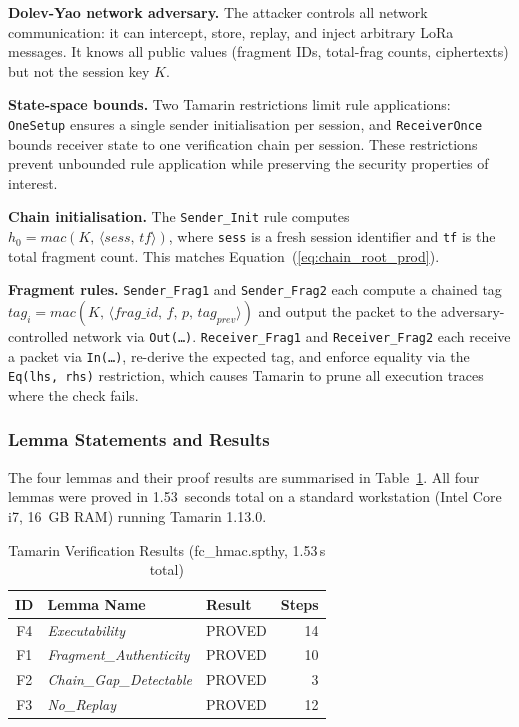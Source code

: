\documentclass[journal]{IEEEtran}
\begin{document}
\textbf{Dolev-Yao network adversary.}  The attacker controls all network
communication: it can intercept, store, replay, and inject arbitrary LoRa
messages.  It knows all public values (fragment IDs, total-frag counts,
ciphertexts) but not the session key $K$.

\textbf{State-space bounds.}  Two Tamarin restrictions limit rule applications:
\texttt{OneSetup} ensures a single sender initialisation per session, and
\texttt{ReceiverOnce} bounds receiver state to one verification chain per
session.  These restrictions prevent unbounded rule application while preserving
the security properties of interest.

\textbf{Chain initialisation.}  The \texttt{Sender\_Init} rule computes
$h_0 = \mathit{mac}(K,\, \langle \mathit{sess},\, \mathit{tf} \rangle)$,
where \texttt{sess} is a fresh session identifier and \texttt{tf} is the total
fragment count.  This matches Equation~(\ref{eq:chain_root_prod}).

\textbf{Fragment rules.}  \texttt{Sender\_Frag1} and \texttt{Sender\_Frag2}
each compute a chained tag
$\mathit{tag}_i = \mathit{mac}(K,\,
 \langle \mathit{frag\_id},\, f,\, p,\, \mathit{tag}_{\mathit{prev}} \rangle)$
and output the packet to the adversary-controlled network via \texttt{Out(\ldots)}.
\texttt{Receiver\_Frag1} and \texttt{Receiver\_Frag2} each receive a packet
via \texttt{In(\ldots)}, re-derive the expected tag, and enforce equality via
the \texttt{Eq(lhs, rhs)} restriction, which causes Tamarin to prune all
execution traces where the check fails.

\subsubsection{Lemma Statements and Results}

The four lemmas and their proof results are summarised in
Table~\ref{tab:tamarin}.  All four lemmas were proved in 1.53~seconds total on a
standard workstation (Intel Core i7, 16~GB RAM) running Tamarin 1.13.0.

\begin{table}[ht]
\centering
\caption{Tamarin Verification Results (fc\_hmac.spthy, 1.53\,s total)}
\label{tab:tamarin}
\begin{tabular}{cllr}
\toprule
ID & Lemma Name & Result & Steps \\
\midrule
F4 & \textit{Executability} & PROVED & 14 \\
F1 & \textit{Fragment\_Authenticity} & PROVED & 10 \\
F2 & \textit{Chain\_Gap\_Detectable} & PROVED & 3 \\
F3 & \textit{No\_Replay} & PROVED & 12 \\
\bottomrule
\end{tabular}
\end{table}
\end{document}

